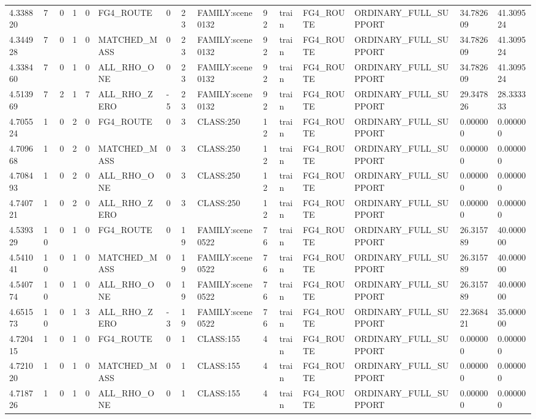 \begin{tabular}{lllllllllllllll}
4.338820 & 7 & 0 & 1 & 0 & FG4\_ROUTE & 0 & 23 & FAMILY:scene0132 & 92 & train & FG4\_ROUTE & ORDINARY\_FULL\_SUPPORT & 34.782609 & 41.309524 \\
4.344928 & 7 & 0 & 1 & 0 & MATCHED\_MASS & 0 & 23 & FAMILY:scene0132 & 92 & train & FG4\_ROUTE & ORDINARY\_FULL\_SUPPORT & 34.782609 & 41.309524 \\
4.338460 & 7 & 0 & 1 & 0 & ALL\_RHO\_ONE & 0 & 23 & FAMILY:scene0132 & 92 & train & FG4\_ROUTE & ORDINARY\_FULL\_SUPPORT & 34.782609 & 41.309524 \\
4.513969 & 7 & 2 & 1 & 7 & ALL\_RHO\_ZERO & -5 & 23 & FAMILY:scene0132 & 92 & train & FG4\_ROUTE & ORDINARY\_FULL\_SUPPORT & 29.347826 & 28.333333 \\
4.705524 & 1 & 0 & 2 & 0 & FG4\_ROUTE & 0 & 3 & CLASS:250 & 12 & train & FG4\_ROUTE & ORDINARY\_FULL\_SUPPORT & 0.000000 & 0.000000 \\
4.709668 & 1 & 0 & 2 & 0 & MATCHED\_MASS & 0 & 3 & CLASS:250 & 12 & train & FG4\_ROUTE & ORDINARY\_FULL\_SUPPORT & 0.000000 & 0.000000 \\
4.708493 & 1 & 0 & 2 & 0 & ALL\_RHO\_ONE & 0 & 3 & CLASS:250 & 12 & train & FG4\_ROUTE & ORDINARY\_FULL\_SUPPORT & 0.000000 & 0.000000 \\
4.740721 & 1 & 0 & 2 & 0 & ALL\_RHO\_ZERO & 0 & 3 & CLASS:250 & 12 & train & FG4\_ROUTE & ORDINARY\_FULL\_SUPPORT & 0.000000 & 0.000000 \\
4.539329 & 10 & 0 & 1 & 0 & FG4\_ROUTE & 0 & 19 & FAMILY:scene0522 & 76 & train & FG4\_ROUTE & ORDINARY\_FULL\_SUPPORT & 26.315789 & 40.000000 \\
4.541041 & 10 & 0 & 1 & 0 & MATCHED\_MASS & 0 & 19 & FAMILY:scene0522 & 76 & train & FG4\_ROUTE & ORDINARY\_FULL\_SUPPORT & 26.315789 & 40.000000 \\
4.540774 & 10 & 0 & 1 & 0 & ALL\_RHO\_ONE & 0 & 19 & FAMILY:scene0522 & 76 & train & FG4\_ROUTE & ORDINARY\_FULL\_SUPPORT & 26.315789 & 40.000000 \\
4.651573 & 10 & 0 & 1 & 3 & ALL\_RHO\_ZERO & -3 & 19 & FAMILY:scene0522 & 76 & train & FG4\_ROUTE & ORDINARY\_FULL\_SUPPORT & 22.368421 & 35.000000 \\
4.720415 & 1 & 0 & 1 & 0 & FG4\_ROUTE & 0 & 1 & CLASS:155 & 4 & train & FG4\_ROUTE & ORDINARY\_FULL\_SUPPORT & 0.000000 & 0.000000 \\
4.721020 & 1 & 0 & 1 & 0 & MATCHED\_MASS & 0 & 1 & CLASS:155 & 4 & train & FG4\_ROUTE & ORDINARY\_FULL\_SUPPORT & 0.000000 & 0.000000 \\
4.718726 & 1 & 0 & 1 & 0 & ALL\_RHO\_ONE & 0 & 1 & CLASS:155 & 4 & train & FG4\_ROUTE & ORDINARY\_FULL\_SUPPORT & 0.000000 & 0.000000 \\

\end{tabular}

